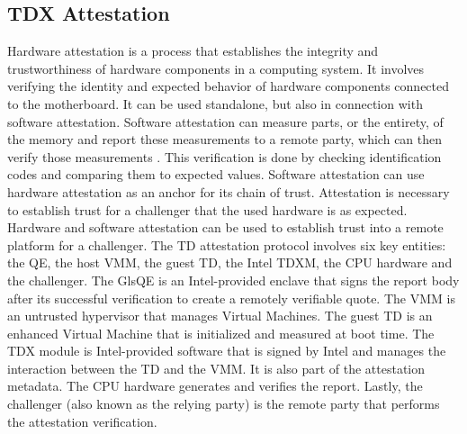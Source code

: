 \subsection{TDX Attestation}
\label{TDX attestation}
Hardware attestation is a process that establishes the integrity and trustworthiness of hardware components in a computing system. It involves verifying the identity and expected behavior of hardware components connected to the motherboard. It can be used standalone, but also in connection with software attestation. Software attestation can measure parts, or the entirety, of the memory and report these measurements to a remote party, which can then verify those measurements \cite{frederic_stumpf_leveraging_2011}. This verification is done by checking identification codes and comparing them to expected values. Software attestation can use hardware attestation as an anchor for its chain of trust. Attestation is necessary to establish trust for a challenger that the used hardware is as expected. Hardware and software attestation can be used to establish trust into a remote platform for a challenger.
The TD attestation protocol involves six key entities: the \Gls{QE}, the host \Gls{VMM}, the guest \Gls{TD}, the Intel \Gls{TDXM}, the CPU hardware and the challenger. The Gls{QE} is an Intel-provided enclave that signs the report body after its successful verification to create a remotely verifiable quote. The VMM is an untrusted hypervisor that manages Virtual Machines. The guest TD is an enhanced Virtual Machine that is initialized and measured at boot time. The TDX module is Intel-provided software that is signed by Intel and manages the interaction between the TD and the VMM. It is also part of the attestation metadata. The CPU hardware generates and verifies the report. Lastly, the challenger (also known as the relying party) is the remote party that performs the attestation verification.


